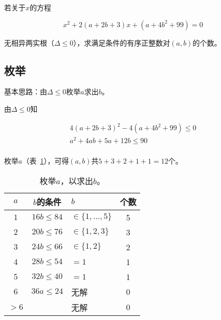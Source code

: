 

若关于$x$的方程

\[ x^2 + 2(a + 2b + 3)x + (a + 4b^2 + 99) = 0 \]

无相异两实根（$\Delta \le0$），求满足条件的有序正整数对$(a, b)$的个数。


\subsection{枚举}

基本思路：由$\Delta \le0$枚举$a$求出$b$。

由$\Delta \le0$知

\begin{align*}
  4(a + 2b + 3)^2 - 4(a + 4b^2 + 99) \le0 \\
  a^2 + 4ab + 5a + 12b \le90 \\
\end{align*}

枚举$a$（表~\ref{tab:0067-enum}），可得$(a, b)$共$5 + 3 + 2 + 1 + 1 = 12$个。

\begin{table}[hbp]
  \centering
  \begin{tabular}{cclc}
    \toprule
    $a$ & $b$的条件 & $b$ & 个数 \\
    \midrule
    $1$ & $16b \le84$ & $\in \{1, \dots, 5\}$ & 5 \\
    $2$ & $20b \le76$ & $\in \{1, 2, 3\}$ & 3 \\
    $3$ & $24b \le66$ & $\in \{1, 2\}$ & 2 \\
    $4$ & $28b \le54$ & $= 1$ & 1 \\
    $5$ & $32b \le40$ & $= 1$ & 1 \\
    $6$ & $36a \le24$ & 无解 & 0 \\
    $> 6$ & & 无解 & 0 \\
    \bottomrule
  \end{tabular}
  \caption{枚举$a$，以求出$b$。} \label{tab:0067-enum}
\end{table}
